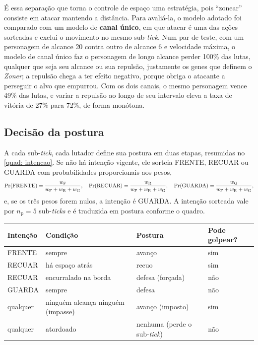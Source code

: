 É essa separação que torna o controle de espaço uma estratégia, pois ``zonear'' consiste em atacar mantendo a distância. Para avaliá-la, o modelo adotado foi comparado com um modelo de \textbf{canal único}, em que atacar é uma das ações sorteadas e exclui o movimento no mesmo sub-\textit{tick}. Num par de teste, com um personagem de alcance 20 contra outro de alcance 6 e velocidade máxima, o modelo de canal único faz o personagem de longo alcance perder 100\% das lutas, qualquer que seja seu alcance ou sua repulsão, justamente os genes que definem o \textit{Zoner}; a repulsão chega a ter efeito negativo, porque obriga o atacante a perseguir o alvo que empurrou. Com os dois canais, o mesmo personagem vence 49\% das lutas, e variar a repulsão ao longo de seu intervalo eleva a taxa de vitória de 27\% para 72\%, de forma monótona.

\subsection{Decisão da postura}
\label{sub: postura}

A cada sub-\textit{tick}, cada lutador define sua postura em duas etapas, resumidas no \autoref{quad: intencao}. Se não há intenção vigente, ele sorteia FRENTE, RECUAR ou GUARDA com probabilidades proporcionais aos pesos,
\begin{equation}
    \label{eq: intencao}
    \Pr(\text{FRENTE}) = \frac{w_{\mathrm{F}}}{w_{\mathrm{F}} + w_{\mathrm{R}} + w_{\mathrm{G}}}, \quad
    \Pr(\text{RECUAR}) = \frac{w_{\mathrm{R}}}{w_{\mathrm{F}} + w_{\mathrm{R}} + w_{\mathrm{G}}}, \quad
    \Pr(\text{GUARDA}) = \frac{w_{\mathrm{G}}}{w_{\mathrm{F}} + w_{\mathrm{R}} + w_{\mathrm{G}}},
\end{equation}
e, se os três pesos forem nulos, a intenção é GUARDA. A intenção sorteada vale por $n_{\mathrm{p}} = 5$ sub-\textit{ticks} e é traduzida em postura conforme o quadro.

\begin{quadro}[htb]
    \caption{Tradução da intenção sorteada na postura do sub-\textit{tick}.}
    \label{quad: intencao}
    \centering
    \small
    \begin{tabularx}{\textwidth}{l l l X}
        \toprule
        \textbf{Intenção} & \textbf{Condição} & \textbf{Postura} & \textbf{Pode golpear?} \\
        \midrule
        FRENTE & sempre & avanço & sim \\
        RECUAR & há espaço atrás & recuo & sim \\
        RECUAR & encurralado na borda & defesa (forçada) & não \\
        GUARDA & sempre & defesa & não \\
        \midrule
        qualquer & ninguém alcança ninguém (impasse) & avanço (imposto) & sim \\
        qualquer & atordoado & nenhuma (perde o sub-\textit{tick}) & não \\
        \bottomrule
    \end{tabularx}
    \source
\end{quadro}

